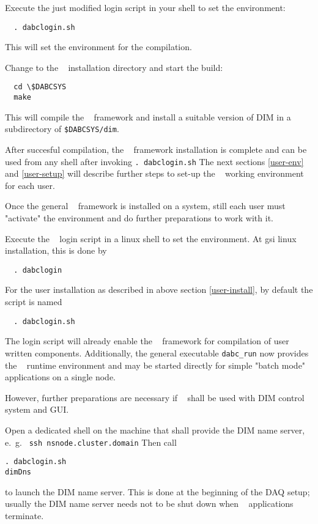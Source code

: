 \item Execute the just modified login script in your shell to set the environment:  
  \begin{verbatim}
  . dabclogin.sh
  \end{verbatim} 
  This will set the environment for the compilation.

\item Change to the \dabc~ installation directory and start the build:
  \begin{verbatim}
  cd \$DABCSYS
  make
  \end{verbatim} 
  This will compile the \dabc~ framework and install a suitable version of DIM in a
  subdirectory of {\tt \$DABCSYS/dim}.

\enum

After succesful compilation, the \dabc~ framework installation is complete
and can be used from any shell after invoking {\tt . dabclogin.sh}
The next sections \ref{user-env} and \ref{user-setup} will describe further steps 
to set-up the \dabc~ working environment for each user.


Once the general \dabc~ framework is installed on a system, still each user
must "activate" the environment and do further preparations to work with it.

\bnum
\item Execute the \dabc~ login script in a linux shell to set the environment.
At gsi linux installation, this is done by  
\begin{verbatim}
  . dabclogin
  \end{verbatim} 
For the user installation as described in above section \ref{user-install},
by default the script is named   
  \begin{verbatim}
  . dabclogin.sh
  \end{verbatim} 
The login script will already enable the \dabc~ framework for
compilation of user written components. Additionally, 
the general executable {\tt dabc\_run} now provides
the \dabc~ runtime environment and may be started directly 
for simple "batch mode" applications on a single node. 

However, further preparations are necessary if \dabc~ shall be used with
DIM control system and GUI.

\item Open a dedicated shell on the machine that shall provide the DIM name server,
e.~g.~ {\tt ssh nsnode.cluster.domain}
Then call 
\begin{verbatim}
. dabclogin.sh
dimDns  
\end{verbatim} 
to launch the DIM name server. This is done  at the beginning of
the DAQ setup; usually the DIM name server needs not to be shut down 
when \dabc~ applications terminate.

